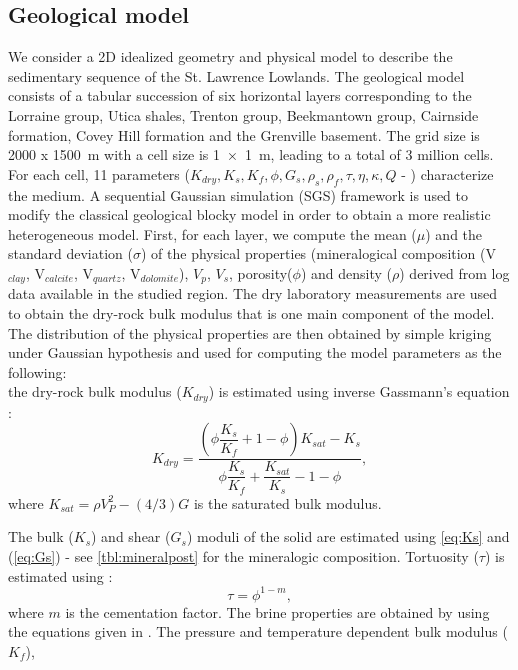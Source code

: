 \subsection{Geological model}
We consider a 2D idealized geometry and physical model to describe the
sedimentary sequence of the St. Lawrence Lowlands. The geological model consists
of a tabular succession of six horizontal layers corresponding to the Lorraine
group, Utica shales, Trenton group, Beekmantown group, Cairnside formation,
Covey Hill formation and the Grenville basement. The grid size is \SI{2000 x
1500}{\metre} with a cell size is \SI{1 x 1}{\metre}, leading to a total of
\num{3} million cells. For each cell, \num{11} parameters
($K_{dry},K_s,K_f,\phi,G_s,\rho_s,\rho_f,\tau,\eta,\kappa,Q$ -
) characterize the medium.
A sequential Gaussian simulation (SGS) framework is used to modify the classical
geological blocky model in order to obtain a more realistic heterogeneous model.
First, for each layer, we compute the mean ($\mu$) and the standard deviation
($\sigma$) of the physical properties (mineralogical composition (V$_{clay}$,
V$_{calcite}$, V$_{quartz}$, V$_{dolomite}$), $V_p$, $V_s$, porosity($\phi$) and
density ($\rho$) derived from log data available in the studied region. The dry
laboratory measurements are used to obtain the dry-rock bulk modulus that is one
main component of the model. The distribution of the physical properties are
then obtained by simple kriging under Gaussian hypothesis and used for computing
the model parameters as the following:\\
the dry-rock bulk modulus ($K_{dry}$) is estimated using inverse Gassmann's
equation \citep{Hamilton1971,Carcione2007}:
\begin{equation}
K_{dry} = \dfrac{(\phi \dfrac{K_s}{K_f} + 1 - \phi)K_{sat} - K_s}{\phi
\dfrac{K_s}{K_f} + \dfrac{K_{sat}}{K_s} - 1 - \phi},
\end{equation}
where $K_{sat} = \rho V_{P}^{2} - (4/3)G$ is the saturated bulk modulus.\par
The bulk ($K_s$) and shear ($G_s$) moduli of the solid are estimated using
\cref{eq:Ks} and (\ref{eq:Gs}) - see \cref{tbl:mineralpost} for the mineralogic
composition.
Tortuosity ($\tau$) is estimated using \citep{Glover2009}:
\begin{equation}
\tau = \phi^{1-m},
\end{equation}
where $m$ is the cementation factor.
The brine properties are obtained by using the equations given in
\citet{Batzle1992}. The pressure and temperature dependent bulk modulus ($K_f$),
